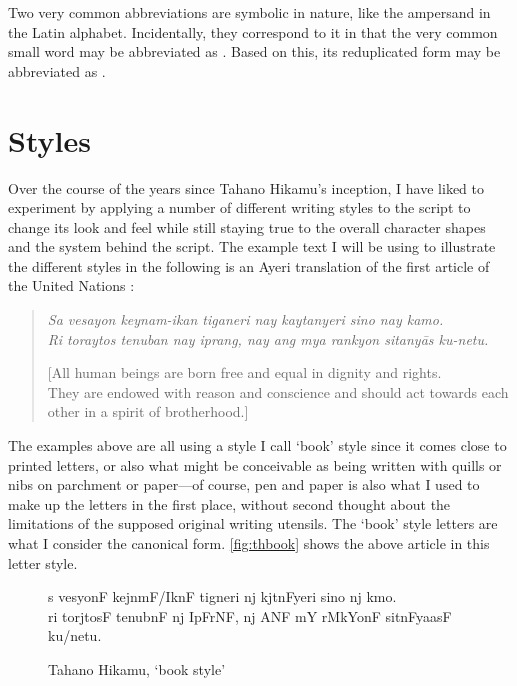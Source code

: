 Two very common abbreviations are symbolic in nature, like the ampersand
\orth{\&} in the Latin alphabet. Incidentally, they correspond to it in
that the very common small word  may be abbreviated as
\ayr{\&}. Based on this, its reduplicated form  may be abbreviated as \ayr{+}.


\section{Styles}

Over the course of the years since Tahano Hikamu's inception, I have liked to
experiment by applying a number of different writing styles to the script to
change its look and feel while still staying true to the overall character
shapes and the system behind the script. The example text I will be using to
illustrate the different styles in the following is an Ayeri translation of the
first article of the United Nations
 \citep{benung:udhr}:

\blockcquote[Article 1]{udhr}{\textit{Sa vesayon keynam-ikan tiganeri nay
kaytanyeri sino nay kamo.\\
Ri toraytos tenuban nay iprang, nay ang mya rankyon sitanyās ku-netu.}

[All human beings are born free and equal in dignity and rights.\\
They are endowed with reason and conscience and should act towards each other 
in a spirit of brotherhood.]}

 The examples above are all using a
style I call `book' style since it comes close to printed letters, or also what
might be conceivable as being written with quills or nibs on parchment or 
paper---of course, pen and paper is also what I used to make up the letters in
the first place, without second thought about the limitations of the supposed
original writing utensils. The `book' style letters are what I consider the
canonical form. \autoref{fig:thbook} shows the above article in this letter
style.

\begin{figure}[ht]\centering
{\Tagati\Large s vesyonF kejnmF/IknF tigneri nj kjtnFyeri sino nj kmo.\\
ri torjtosF tenubnF nj IpFrNF, nj ANF mY rMkYonF sitnFyaasF 
ku/netu.}
\caption{Tahano Hikamu, `book style'}
\label{fig:thbook}
\end{figure}

